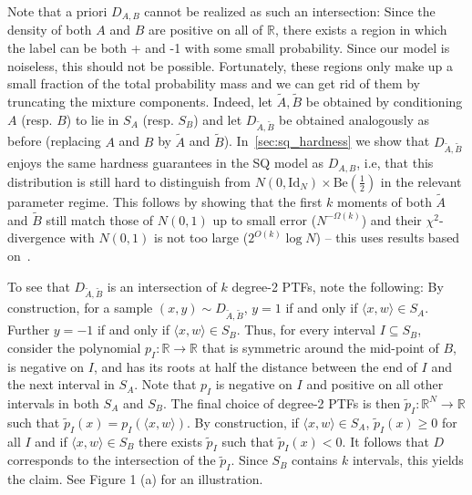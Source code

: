 \documentclass{theoretics}
\newcommand{\iprod}[1]{\langle#1\rangle}
\newcommand{\R}{\mathbb R}
\renewcommand{\geq}{\geqslant}
\newcommand{\sse}{\subseteq}
\newcommand*{\Id}{\mathrm{Id}}
\newcommand{\Be}[1]{\mathrm{Be}(#1)}
\begin{document}
Note that a priori $D_{A,B}$ cannot be realized as such an intersection:
Since the density of both $A$ and $B$ are positive on all of $\R$, there exists a region in which the label can be both + and -1 with some small probability.
Since our model is noiseless, this should not be possible.
Fortunately, these regions only make up a small fraction of the total probability mass and we can get rid of them by truncating the mixture components.
Indeed, let $\tilde{A},\tilde{B}$ be obtained by conditioning $A$ (resp. $B$) to lie in $S_A$ (resp. $S_B$) and let $D_{\tilde{A},\tilde{B}}$ be obtained analogously as before (replacing $A$ and $B$ by $\tilde{A}$ and $\tilde{B}$).
In~\cref{sec:sq_hardness} we show that $D_{\tilde{A},\tilde{B}}$ enjoys the same hardness guarantees in the SQ model as $D_{A,B}$, i.e, that this distribution is still hard to distinguish from $N(0,\Id_N) \times \Be{\tfrac 1 2}$ in the relevant parameter regime.
This follows by showing that the first $k$ moments of both $\tilde{A}$ and $\tilde{B}$ still match those of $N(0,1)$ up to small error ($N^{-\Omega(k)}$) and their $\chi^2$-divergence with $N(0,1)$ is not too large ($2^{O(k)} \log N$) -- this uses results based on~\cite{DK22}.


To see that $D_{\tilde{A},\tilde{B}}$ is an intersection of $k$ degree-2 PTFs, note the following:
By construction, for a sample $(x,y) \sim D_{\tilde{A},\tilde{B}}$, $y = 1$ if and only if $\iprod{x,w} \in S_A$.
Further $y = -1$ if and only if $\iprod{x,w} \in S_B$.
Thus, for every interval $I \sse S_B$, consider the polynomial $p_I \colon \R \rightarrow \R$ that is symmetric around the mid-point of $B$, is negative on $I$, and has its roots at half the distance between the end of $I$ and the next interval in $S_A$.
Note that $p_I$ is negative on $I$ and positive on all other intervals in both $S_A$ and $S_B$.
The final choice of degree-2 PTFs is then $\tilde{p}_I \colon \R^N \rightarrow \R$ such that $\tilde{p}_I(x) = p_I(\iprod{x,w})$.
By construction, if $\iprod{x,w} \in S_A$, $\tilde{p}_I(x) \geq 0$ for all $I$ and if $\iprod{x,w} \in S_B$ there exists $\tilde{p}_I$ such that $\tilde{p}_I(x) < 0$.
It follows that $D$ corresponds to the intersection of the $\tilde{p}_I$.
Since $S_B$ contains $k$ intervals, this yields the claim.
See Figure 1 (a) for an illustration.

\end{document}
